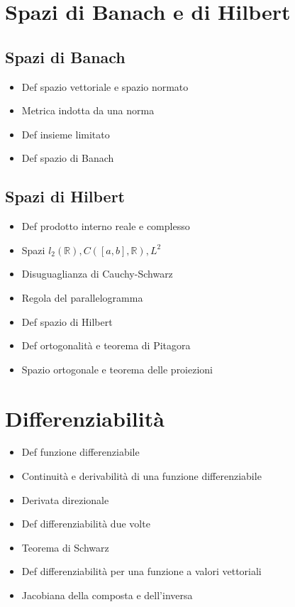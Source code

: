 \documentclass[10pt,a4paper]{article}
\newcommand{\R}{\mathbb{R}}
\renewcommand{\,}{\text{, }}
\begin{document}
\section{Spazi di Banach e di Hilbert}
\subsection{Spazi di Banach}
\begin{itemize}
    \item Def spazio vettoriale e spazio normato
    \item Metrica indotta da una norma
    \item Def insieme limitato
    \item Def spazio di Banach
\end{itemize}
\subsection{Spazi di Hilbert}
\begin{itemize}
    \item Def prodotto interno reale e complesso
    \item Spazi $l_2(\R), C([a,b],\R), L^2$
    \item Disuguaglianza di Cauchy-Schwarz
    \item Regola del parallelogramma
    \item Def spazio di Hilbert
    \item Def ortogonalità e teorema di Pitagora
    \item Spazio ortogonale e teorema delle proiezioni
\end{itemize}

\section{Differenziabilità}
\begin{itemize}
    \item Def funzione differenziabile
    \item Continuità e derivabilità di una funzione differenziabile
    \item Derivata direzionale
    \item Def differenziabilità due volte
    \item Teorema di Schwarz
    \item Def differenziabilità per una funzione a valori vettoriali
    \item Jacobiana della composta e dell'inversa
\end{itemize}
\end{document}
